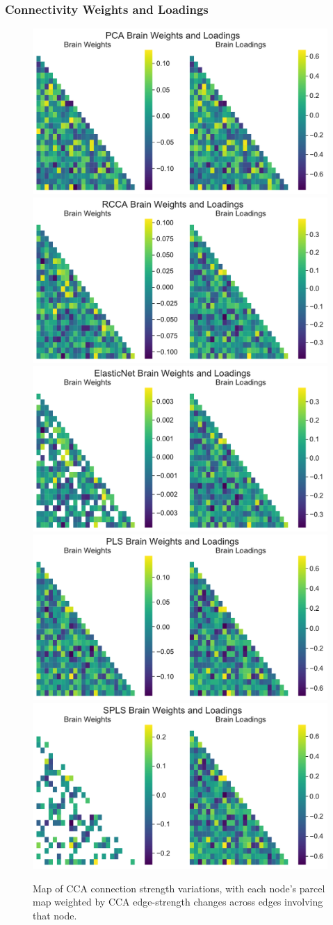\subsubsection{Connectivity Weights and Loadings}
\begin{figure}
\centering
\includegraphics[width=0.6\linewidth]{figures/regularization/hcp/PCA brain weights and loadings.pdf}
\includegraphics[width=0.6\linewidth]{figures/regularization/hcp/RCCA brain weights and loadings.pdf}
\includegraphics[width=0.6\linewidth]{figures/regularization/hcp/ElasticNet brain weights and loadings.pdf}
\includegraphics[width=0.6\linewidth]{figures/regularization/hcp/PLS brain weights and loadings.pdf}
\includegraphics[width=0.6\linewidth]{figures/regularization/hcp/SPLS brain weights and loadings.pdf}
\caption*{Map of CCA connection strength variations, with each node’s parcel map weighted by CCA edge-strength changes across edges involving that node.}
\label{fig:brain-connectivity}
\end{figure}

